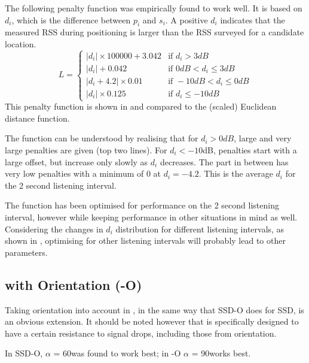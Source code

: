 The following penalty function was empirically found to work well.
It is based on $d_i$, which is the difference between $p_i$ and $s_i$.
A positive $d_i$ indicates that the measured RSS during positioning is larger than the RSS surveyed for a candidate location.
\begin{equation}
    L = \begin{cases}
        |d_i| \times 100000 +3.042  & \text{if } d_i > 3dB \\
        |d_i| +0.042                & \text{if } 0dB < d_i \leq 3dB \\
        |d_i+4.2| \times 0.01       & \text{if } -10dB < d_i \leq 0dB \\
        |d_i| \times 0.125          & \text{if } d_i \leq -10dB 
    \end{cases}
    \label{eq:architecture-BRP-punishment}
\end{equation}
This penalty function is shown in  and compared to the (scaled) Euclidean distance function.

The function can be understood by realising that for $d_i > 0dB$, large and very large penalties are given (top two lines).
For $d_i < -10$dB, penalties start with a large offset, but increase only slowly as $d_i$ decreases.
The part in between has very low penalties with a minimum of 0 at $d_i = -4.2$.
This is the average $d_i$ for the 2 second listening interval.

The function has been optimised for performance on the 2 second listening interval, however while keeping performance in other situations in mind as well.
Considering the changes in $d_i$ distribution for different listening intervals, as shown in , optimising for other listening intervals will probably lead to other parameters.

\subsection{\BRP with Orientation (\aBRP-O)}
Taking orientation into account in \aBRP, in the same way that SSD-O does for SSD, is an obvious extension.
It should be noted however that \aBRP is specifically designed to have a certain resistance to signal drops, including those from orientation.

In SSD-O, $\alpha$ = 60\tdegree was found to work best; in \aBRP-O $\alpha$ = 90\tdegree works best.

